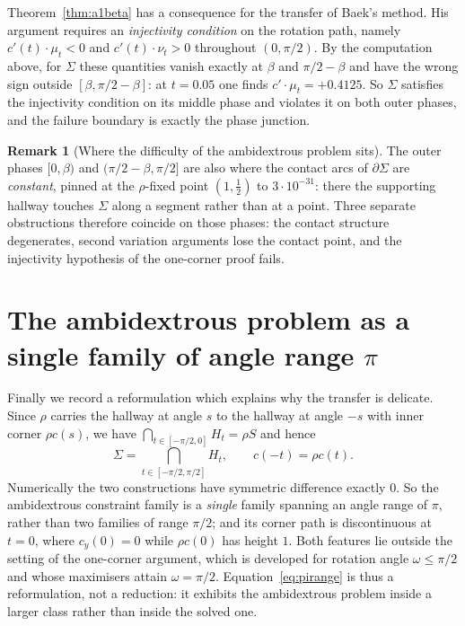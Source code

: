 \documentclass[11pt]{article}
\theoremstyle{definition}
\newtheorem{remark}[theorem]{Remark}
\newcommand{\Sig}{\Sigma}
\begin{document}
Theorem~\ref{thm:a1beta} has a consequence for the transfer of Baek's method.
His argument requires an \emph{injectivity condition} on the rotation path,
namely $c'(t)\cdot\mu_t<0$ and $c'(t)\cdot\nu_t>0$ throughout $(0,\pi/2)$. By the
computation above, for $\Sig$ these quantities vanish exactly at $\beta$ and
$\pi/2-\beta$ and have the wrong sign outside $[\beta,\pi/2-\beta]$: at
$t=0.05$ one finds $c'\cdot\mu_t=+0.4125$. So $\Sig$ satisfies the injectivity
condition on its middle phase and violates it on both outer phases, and the
failure boundary is exactly the phase junction.

\begin{remark}[Where the difficulty of the ambidextrous problem sits]\label{rem:degen}
The outer phases $[0,\beta)$ and $(\pi/2-\beta,\pi/2]$ are also where the contact
arcs of $\partial\Sig$ are \emph{constant}, pinned at the $\rho$-fixed point
$(1,\tfrac12)$ to $3\cdot10^{-31}$: there the supporting hallway touches
$\Sig$ along a segment rather than at a point. Three separate obstructions
therefore coincide on those phases: the contact structure degenerates, second
variation arguments lose the contact point, and the injectivity hypothesis of the
one-corner proof fails.
\end{remark}

\section{The ambidextrous problem as a single family of angle range \texorpdfstring{$\pi$}{pi}}

Finally we record a reformulation which explains why the transfer is delicate.
Since $\rho$ carries the hallway at angle $s$ to the hallway at angle $-s$ with
inner corner $\rho c(s)$, we have
$\bigcap_{t\in[-\pi/2,0]}H_t=\rho S$ and hence
\begin{equation}\label{eq:pirange}
  \Sig=\bigcap_{t\in[-\pi/2,\pi/2]}H_t,\qquad c(-t)=\rho c(t).
\end{equation}
Numerically the two constructions have symmetric difference exactly $0$. So the
ambidextrous constraint family is a \emph{single} family spanning an angle range
of $\pi$, rather than two families of range $\pi/2$; and its corner path is
discontinuous at $t=0$, where $c_y(0)=0$ while $\rho c(0)$ has height $1$. Both
features lie outside the setting of the one-corner argument, which is developed
for rotation angle $\omega\le\pi/2$ and whose maximisers attain $\omega=\pi/2$.
Equation~\eqref{eq:pirange} is thus a reformulation, not a reduction: it exhibits
the ambidextrous problem inside a larger class rather than inside the solved one.
\end{document}
